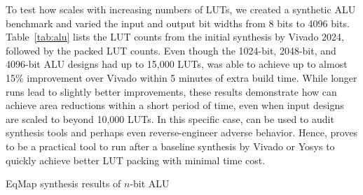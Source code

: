 To test how \shortname{} scales with increasing numbers of LUTs, we created a
synthetic ALU benchmark and varied the input and output bit widths from 8 bits
to 4096 bits. Table~\ref{tab:alu} lists the LUT counts from the initial
synthesis by Vivado 2024, followed by the packed LUT counts. Even though the
1024-bit, 2048-bit, and 4096-bit ALU designs had up to 15,000 LUTs,
\shortname{} was able to achieve up to almost 15\% improvement over Vivado
within 5 minutes of extra build time. While longer runs lead to slightly better
improvements, these results demonstrate how \shortname{} can achieve area
reductions within a short period of time, even when input designs are scaled to
beyond 10,000 LUTs. In this specific case, \shortname{} can be used to audit
synthesis tools and perhaps even reverse-engineer adverse behavior. Hence,
\shortname{} proves to be a practical tool to run after a baseline synthesis by
Vivado or Yosys to quickly achieve better LUT packing with minimal time cost.

\begin{table}
    \centering
    \caption{EqMap synthesis results of $n$-bit ALU}\label{tab:alu}
\end{table}